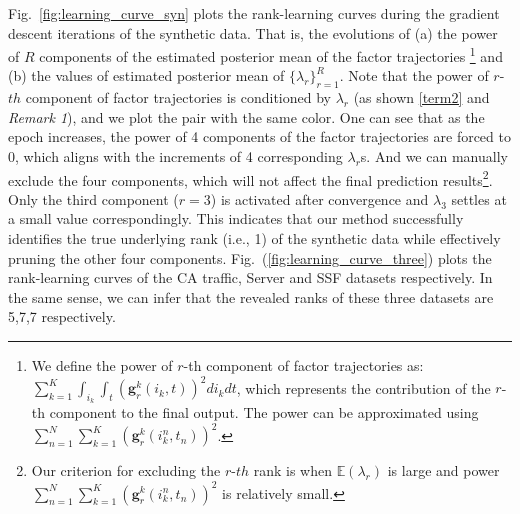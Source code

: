 Fig.~\ref{fig:learning_curve_syn}  plots the rank-learning curves during the gradient descent iterations of the synthetic data. That is, the evolutions of (a) the power of $R$ components of the estimated posterior mean of the factor trajectories \footnote{We define the power  of $r$-th component of factor trajectories as: $\sum_{k=1}^{K}\int_{i_k}\int_{t}(\mathbf{g}^k_r(i_k,t))^2di_kdt$, which represents  the contribution of the $r$-th component to the final output. The power can be approximated using $\sum_{n=1}^{N}\sum_{k=1}^{K}(\mathbf{g}^k_r(i_k^n,t_n))^2$.}
and (b) the values of estimated posterior mean of $\{\lambda_r\}_{r=1}^{R}$. Note that the power of $r$-$th$ component of factor trajectories is conditioned by $\lambda_r$ (as shown \eqref{term2} and \textit{Remark 1}), and we plot the pair with the same color. One can see that as the epoch increases, the power of 4 components of the factor trajectories are forced to 0, which  aligns with the increments of 4 corresponding $\lambda_r$s. And we can manually exclude the four components, which will not affect the final prediction results\footnote{Our criterion for excluding the $r$-$th$ rank is when $\mathbb{E}(\lambda_r)$ is large and power $\sum_{n=1}^{N}\sum_{k=1}^{K}(\mathbf{g}^k_r(i_k^n,t_n))^2$ is relatively small.}. Only the third component ($r=3$) is activated after convergence and $\lambda_3$ settles at a small value correspondingly. This indicates that our method successfully identifies the true underlying rank (i.e., 1) of the synthetic data while effectively pruning the other four components. Fig.~(\ref{fig:learning_curve_three}) plots the rank-learning curves of the CA traffic, Server and SSF datasets respectively. In the same sense, we can infer that the revealed ranks of these three datasets are 5,7,7 respectively.
\label{ap:b}





